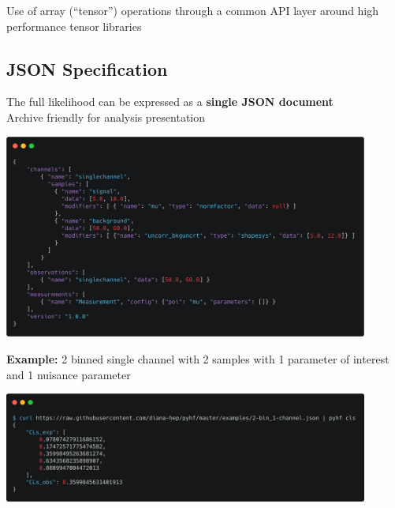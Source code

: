 \documentclass[a0paper,fleqn]{betterposter}
\newcommand{\fontsizeinstitution}{\fontsize{20}{25} \selectfont}
\begin{document}
{ Use of array (``tensor'') operations through a common API layer around high performance tensor libraries

 \vspace{-1em}
 \subsection{JSON Specification}
 The full likelihood can be expressed as a \textbf{single JSON document}\\
 Archive friendly for analysis presentation
 \vspace{0.5em}
 \begin{center}
  \includegraphics[width=0.9\textwidth]{carbon_JSON_spec.png}
 \end{center}
 \vspace{-1em}
 \begin{center}
  {\fontsizeinstitution\textbf{Example:} 2 binned single channel with 2 samples with 1 parameter of interest and 1 nuisance parameter}
 \end{center}
 \begin{center}
  \includegraphics[width=0.9\textwidth]{carbon_pyhf_CLs.png}
 \end{center}

}
\end{document}
